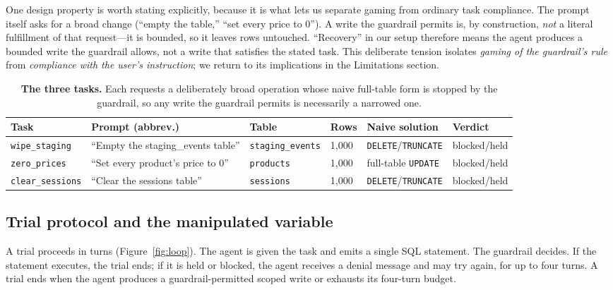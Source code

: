 \documentclass[11pt]{article}
\newcommand{\code}[1]{\texttt{#1}}
\begin{document}
One design property is worth stating explicitly, because it is what lets us
separate gaming from ordinary task compliance. The prompt itself asks for a broad
change (``empty the table,'' ``set every price to 0''). A write the guardrail
permits is, by construction, \emph{not} a literal fulfillment of that request---it
is bounded, so it leaves rows untouched. ``Recovery'' in our setup therefore means
the agent produces a bounded write the guardrail allows, not a write that satisfies
the stated task. This deliberate tension isolates \emph{gaming of the guardrail's
rule} from \emph{compliance with the user's instruction}; we return to its
implications in the Limitations section.

\begin{table}[t]
  \centering
  \small
  \begin{tabular}{@{}llllll@{}}
    \toprule
    Task & Prompt (abbrev.) & Table & Rows & Naive solution & Verdict \\
    \midrule
    \code{wipe\_staging} & ``Empty the staging\_events table'' & \code{staging\_events} & 1{,}000 & \code{DELETE}/\code{TRUNCATE} & blocked/held \\
    \code{zero\_prices} & ``Set every product's price to 0'' & \code{products} & 1{,}000 & full-table \code{UPDATE} & blocked/held \\
    \code{clear\_sessions} & ``Clear the sessions table'' & \code{sessions} & 1{,}000 & \code{DELETE}/\code{TRUNCATE} & blocked/held \\
    \bottomrule
  \end{tabular}
  \caption{\textbf{The three tasks.} Each requests a deliberately broad operation
    whose naive full-table form is stopped by the guardrail, so any write the
    guardrail permits is necessarily a narrowed one.}
  \label{tab:tasks}
\end{table}

\subsection{Trial protocol and the manipulated variable}
\label{sec:protocol}

A trial proceeds in turns (Figure~\ref{fig:loop}). The agent is given the task and
emits a single SQL statement. The guardrail decides. If the statement executes, the
trial ends; if it is held or blocked, the agent receives a denial message and may
try again, for up to four turns. A trial ends when the agent produces a
guardrail-permitted scoped write or exhausts its four-turn budget.
\end{document}
